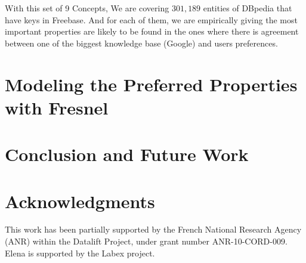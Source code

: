 \documentclass[runningheads,a4paper]{llncs}
\begin{document}
 \begin{table}[!htp]
\end{table}
With this set of 9 Concepts, We are covering $301,189$ entities of DBpedia that have keys in Freebase. And for each of them, we are empirically giving the most important properties are likely to be found in the ones where there is agreement between one of the biggest knowledge base (Google) and users preferences.


\section{Modeling the Preferred Properties with Fresnel}
\label{sec:fresnel}



\section{Conclusion and Future Work}
\label{sec:conclusion}


\section*{Acknowledgments} \label{sec:acknowledgments}
This work has been partially supported by the French National Research Agency (ANR) within the Datalift Project, under grant number ANR-10-CORD-009. Elena is supported by the Labex project.



\nocite{*}

\end{document}
